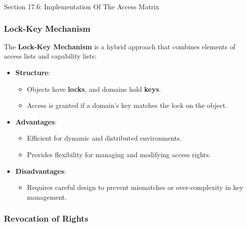 \begin{notes}{Section 17.6: Implementation Of The Access Matrix}
    \subsubsection*{Lock-Key Mechanism}
    
    The \textbf{Lock-Key Mechanism} is a hybrid approach that combines elements of access lists and capability lists:
    \begin{itemize}
        \item \textbf{Structure}:
        \begin{itemize}
            \item Objects have \textbf{locks}, and domains hold \textbf{keys}.
            \item Access is granted if a domain's key matches the lock on the object.
        \end{itemize}
        \item \textbf{Advantages}:
        \begin{itemize}
            \item Efficient for dynamic and distributed environments.
            \item Provides flexibility for managing and modifying access rights.
        \end{itemize}
        \item \textbf{Disadvantages}:
        \begin{itemize}
            \item Requires careful design to prevent mismatches or over-complexity in key management.
        \end{itemize}
    \end{itemize}
    
    \subsubsection*{Revocation of Rights}
    

\end{notes}
